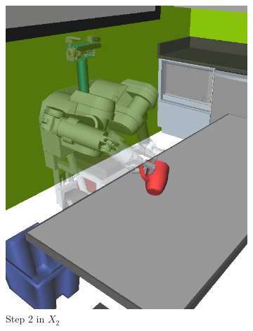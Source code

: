 {\begin{figure}
\begin{widepage}
\begin{subfigure}[t]{0.19\linewidth}
      \includegraphics[width=\columnwidth]{figs/testherb-c.png}
      \caption{Step 2 in $X_2$}
   \end{subfigure}
   \begin{subfigure}[t]{0.19\linewidth}
      \centering

\end{subfigure}
\end{widepage}
\end{figure}}
